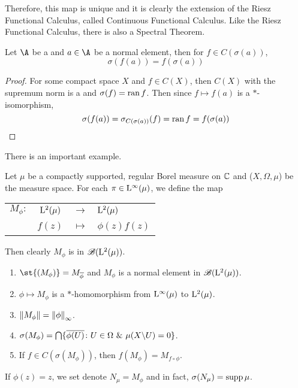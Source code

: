 Therefore, this map is unique and it is clearly the extension of the Riesz Functional Calculus, called Continuous Functional Calculus. Like the Riesz Functional Calculus, there is also a Spectral Theorem.
\begin{thm}
	Let $\A$ be a \Cs and $a \in \A$ be a normal element, then for $f \in C(\sigma(a))$, 
	\begin{equation*}
		\sigma(f(a)) = f(\sigma(a))
	\end{equation*}
\end{thm}
\begin{proof}
	For some compact space $X$ and $f \in C(X)$, then $C(X)$ with the supremum norm is a \Cs and $\sigma(f) = \operatorname{ran}{f}$. Then since $f \mapsto f(a)$ is a $*$-isomorphism, 
	\begin{equation*}
		\sigma(f(a)) = \sigma_{C(\sigma(a))}(f) = \operatorname{ran}{f} = f(\sigma(a)) \qedhere
	\end{equation*}
\end{proof}


There is an important example.
\begin{exam} 
	Let $\mu$ be a compactly supported, regular Borel measure on $\mathbb{C}$ and ($X,\Omega,\mu$) be the measure space. For each $\pi \in \mathrm{L^{\infty}}(\mu)$, we define the map
	\begin{center}
		\begin{tabular}{l c c l}
			$M_{\phi} \colon$ & $\mathrm{L^{2}}(\mu)$ & $\longrightarrow$ & $\mathrm{L^{2}}(\mu)$ \\
			~ & $f(z)$ & $\longmapsto$ & $\phi(z)f(z)$
		\end{tabular} 
	\end{center}
	Then clearly $M_{\phi}$ is in $\mathscr{B}(\mathrm{L^{2}}(\mu))$.
	\begin{enumerate}[label=\arabic*)]
		\item $\st{(M_{\phi})} = M_{\clo{\phi}}$ and $M_{\phi}$ is a normal element in $\mathscr{B}(\mathrm{L^{2}}(\mu))$.
		\item $\phi \mapsto M_{\phi}$ is a $*$-homomorphism from $\mathrm{L^{\infty}}(\mu)$ to $\mathrm{L^{2}}(\mu)$.
		\item $\left\lVert M_{\phi}\right\lVert = \left\lVert\phi\right\lVert_{\infty}$.
		\item $\sigma(M_{\phi})= \bigcap\{\overline{\phi(U)} \colon U \in \Omega ~\&~ \mu(X \backslash U) = 0\}$.
		\item If $f \in C(\sigma(M_{\phi}))$, then $f(M_{\phi}) = M_{f \circ \phi}$.
	\end{enumerate}
	If $\phi(z) = z$, we set denote $N_{\mu} = M_{\phi}$ and in fact, $\sigma(N_{\mu}) = \operatorname{supp}{\mu}$.
\end{exam}


